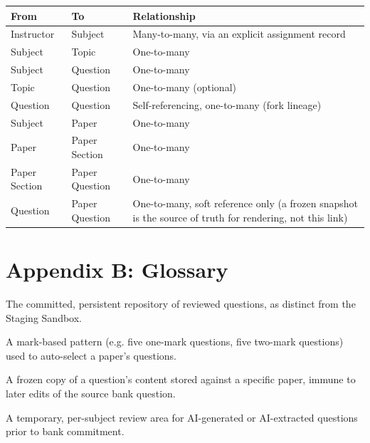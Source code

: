 \documentclass[11pt]{article}
\begin{document}
\begin{longtable}{@{}p{3.6cm}p{3.6cm}p{7cm}@{}}
\toprule
\textbf{From} & \textbf{To} & \textbf{Relationship} \\
\midrule
\endhead
Instructor & Subject & Many-to-many, via an explicit assignment record \\
Subject & Topic & One-to-many \\
Subject & Question & One-to-many \\
Topic & Question & One-to-many (optional) \\
Question & Question & Self-referencing, one-to-many (fork lineage) \\
Subject & Paper & One-to-many \\
Paper & Paper Section & One-to-many \\
Paper Section & Paper Question & One-to-many \\
Question & Paper Question & One-to-many, soft reference only (a frozen
  snapshot is the source of truth for rendering, not this link) \\
\bottomrule
\end{longtable}

\section*{Appendix B: Glossary}

\begin{description}[leftmargin=3.2cm,nosep]
  \item[Bank] The committed, persistent repository of reviewed questions,
    as distinct from the Staging Sandbox.
  \item[Blueprint] A mark-based pattern (e.g. five one-mark questions, five
    two-mark questions) used to auto-select a paper's questions.
  \item[Snapshot] A frozen copy of a question's content stored against a
    specific paper, immune to later edits of the source bank question.
  \item[Staging Sandbox] A temporary, per-subject review area for
    AI-generated or AI-extracted questions prior to bank commitment.
\end{description}
\end{document}
